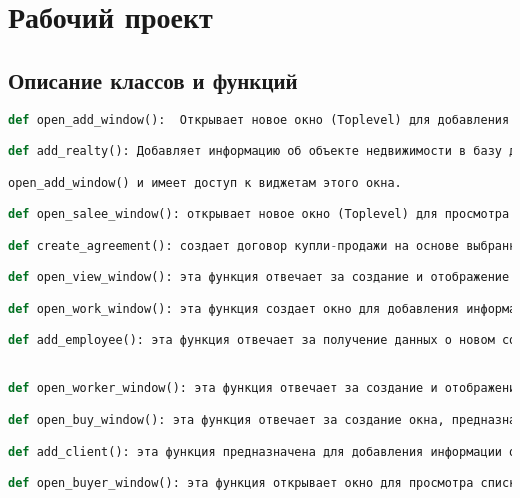 \section{Рабочий проект}
\subsection{Описание классов и функций}
\begin{lstlisting}[language=Python]
def open_add_window():  Открывает новое окно (Toplevel) для добавления информации о недвижимости в базу данных.

def add_realty(): Добавляет информацию об объекте недвижимости в базу данных. Эта функция определена внутри 

open_add_window() и имеет доступ к виджетам этого окна.

def open_salee_window(): открывает новое окно (Toplevel) для просмотра данных о продажах из таблицы sale базы данных.

def create_agreement(): создает договор купли-продажи на основе выбранной записи в списке продаж.

def open_view_window(): эта функция отвечает за создание и отображение окна просмотра объектов недвижимости. Она извлекает данные об объектах из базы данных и отображает их в окне с возможностью прокрутки.

def open_work_window(): эта функция создает окно для добавления информации о новом сотруднике.

def add_employee(): эта функция отвечает за получение данных о новом сотруднике из полей ввода, проверку (хотя бы минимальную) и добавление этой информации в таблицу employee в базе данных.


def open_worker_window(): эта функция отвечает за создание и отображение окна для просмотра списка сотрудников, хранящегося в базе данных.

def open_buy_window(): эта функция отвечает за создание окна, предназначенного для добавления информации о новом покупателе (или арендаторе). Она создает элементы интерфейса, необходимые для ввода данных о покупателе.

def add_client(): эта функция предназначена для добавления информации о новом клиенте (покупателе/арендаторе) в базу данных. Она собирает данные из полей ввода, выполняет минимальную проверку и добавляет запись в таблицу client.

def open_buyer_window(): эта функция открывает окно для просмотра списка клиентов (покупателей/арендаторов), извлекая данные из базы данных и отображая их.


\end{lstlisting}
